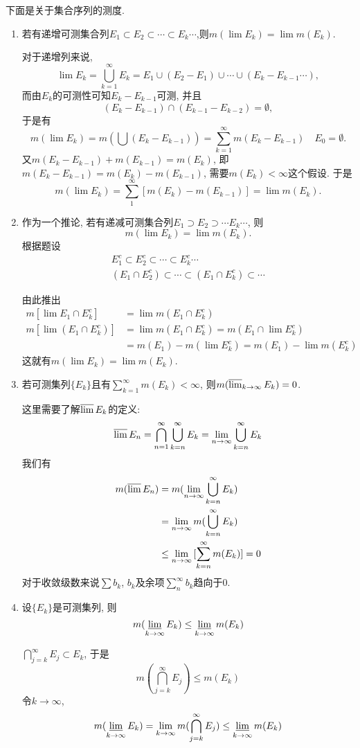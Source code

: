 \documentclass[12pt,a4paper,openany]{book}
\begin{document}
下面是关于集合序列的测度.
\begin{enumerate}
\item 若有递增可测集合列$E_1 \subset E_2 \subset \cdots \subset E_k \cdots$,则$m(\lim{E_k}) = \lim{m(E_k)}$.

对于递增列来说, 
\[\lim{E_k} = \bigcup_{k=1}^{\infty}{E_k} = E_1 \cup (E_2 - E_1) \cup \cdots \cup (E_k - E_{k-1} \cdots),\]
而由$E_k$的可测性可知$E_k - E_{k-1}$可测, 并且
\[
(E_k - E_{k-1}) \cap (E_{k-1} - E_{k-2}) = \emptyset,
\]
于是有
\[
m(\lim{E_k}) = m(\bigcup(E_k - E_{k-1})) = \sum_{k=1}^{\infty}{m(E_k - E_{k-1})} \quad E_0 = \emptyset.
\]
又$m(E_k - E_{k-1}) + m(E_{k-1}) = m(E_k)$, 即$m(E_k - E_{k-1}) = m(E_k) - m(E_{k-1})$, 需要$m(E_k) < \infty$这个假设. 于是
\[
m(\lim{E_k}) = \sum_{1}^{\infty}{[m(E_k) - m(E_{k-1})]} = \lim{m(E_k)}.
\]

\item 作为一个推论, 若有递减可测集合列$E_1 \supset E_2 \supset \cdots E_k \cdots$, 则
\[
m(\lim{E_k}) = \lim{m(E_k)}.
\]
根据题设
\begin{gather*}
E_1^c \subset E_2^c \subset \cdots \subset E_k^c \cdots \\
(E_1 \cap E_2^c) \subset \cdots \subset (E_1 \cap E_k^c) \subset \cdots
\end{gather*}

由此推出
\[
\begin{aligned}
m[\lim{E_1 \cap E_k^c}] &= \lim{m(E_1 \cap E_k^c)} \\
m[\lim{(E_1 \cap E_k^c)}] &= \lim{m(E_1 \cap E_k^c)} = m(E_1 \cap \lim{E_k^c})\\ 
&= m(E_1) - m(\lim{E_k^c}) = m(E_1) - \lim{m(E_k^c)}
\end{aligned}
\]
这就有$m(\lim{E_k}) = \lim{m(E_k)}$.

\item 若可测集列$\{E_k\}$且有$\sum_{k=1}^{\infty}{m(E_k)} < \infty$, 则$m(\varlimsup_{k \rightarrow \infty}{E_k}) = 0$.

这里需要了解$\varlimsup{E_k}$的定义: 
\[
\varlimsup{E_n} = \bigcap_{n=1}^{\infty}{\bigcup_{k=n}^{\infty}{E_k}} = \lim_{n \rightarrow \infty}{\bigcup_{k=n}^{\infty}{E_k}}
\]
我们有
\[
\begin{aligned}
m(\varlimsup{E_n}) & = m(\lim_{n \rightarrow \infty}{\bigcup_{k=n}^{\infty}{E_k}}) \\
&= \lim_{n \rightarrow \infty}{m(\bigcup_{k=n}^{\infty}{E_k})} \\
&\le \lim_{n \rightarrow \infty}{[\sum_{k=n}^{\infty}{m(E_k)}]} = 0
\end{aligned}
\]
对于收敛级数来说$\sum{b_k}$, $b_k$及余项$\sum_{n}^{\infty}{b_k}$趋向于0.

\item 设$\{E_k\}$是可测集列, 则
\[
m(\varliminf_{k \rightarrow \infty}{E_k}) \le \varliminf_{k \rightarrow \infty}{m(E_k)}
\]

$\bigcap_{j=k}^{\infty}{E_j} \subset E_k$, 于是
\[
m(\bigcap_{j=k}^{\infty}{E_j}) \le m(E_k)
\]
令$k \rightarrow \infty$,
\[
m(\varliminf_{k \rightarrow \infty}{E_k}) = \lim_{k \rightarrow \infty}{m(\bigcap_{j=k}^{\infty}{E_j})} \le \varliminf_{k \rightarrow \infty}{m(E_k)}
\]
\end{enumerate}
\end{document}
